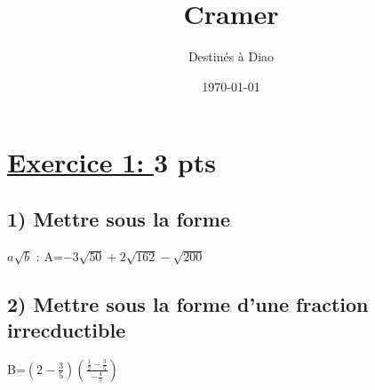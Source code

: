 \documentclass[12pt]{article}
\author{Destinés à Diao}
\title{\textbf{Cramer}}
\date{\today}
\begin{document}
\maketitle
\newpage

\section*{\underline{Exercice 1: }\textbf{3 pts}}
\subsection*{1) Mettre sous la forme } $a\sqrt{b}$ : A=$-3\sqrt{50}+2\sqrt{162}-\sqrt{200}$
\subsection*{2) Mettre sous la forme d'une fraction irrecductible } B=$\left( 2-\frac{3}{5}\right) \left(  \frac{\frac{1}{2}-\frac{3}{5}}{-\frac{4}{5}}\right) $
\end{document}
